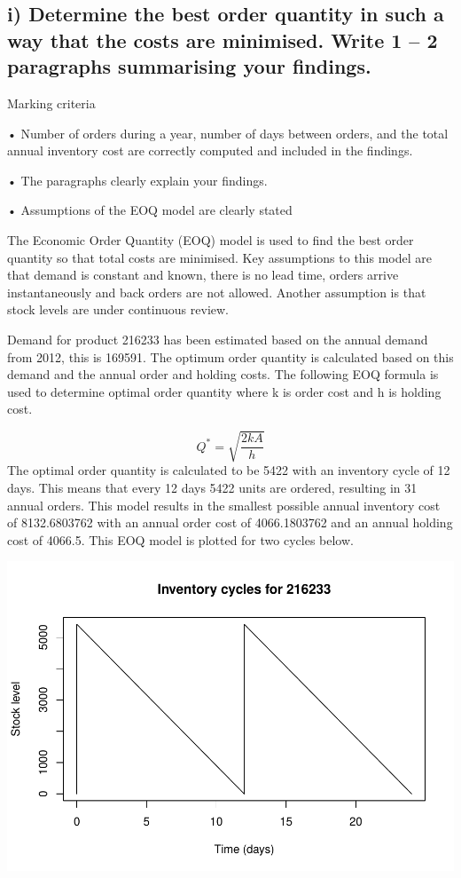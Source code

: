 \documentclass[
  11pt,
]{article}
\begin{document}
\hypertarget{i-determine-the-best-order-quantity-in-such-a-way-that-the-costs-are-minimised.-write-1-2-paragraphs-summarising-your-findings.}{%
\subsection{i) Determine the best order quantity in such a way that the
costs are minimised. Write 1 -- 2 paragraphs summarising your
findings.}\label{i-determine-the-best-order-quantity-in-such-a-way-that-the-costs-are-minimised.-write-1-2-paragraphs-summarising-your-findings.}}

Marking criteria

• Number of orders during a year, number of days between orders, and the
total annual inventory cost are correctly computed and included in the
findings.

• The paragraphs clearly explain your findings.

• Assumptions of the EOQ model are clearly stated

The Economic Order Quantity (EOQ) model is used to find the best order
quantity so that total costs are minimised. Key assumptions to this
model are that demand is constant and known, there is no lead time,
orders arrive instantaneously and back orders are not allowed. Another
assumption is that stock levels are under continuous review.

Demand for product 216233 has been estimated based on the annual demand
from 2012, this is 169591. The optimum order quantity is calculated
based on this demand and the annual order and holding costs. The
following EOQ formula is used to determine optimal order quantity where
k is order cost and h is holding cost.

\[Q^* =  \sqrt{\frac{2kA}{h}}\] The optimal order quantity is calculated
to be 5422 with an inventory cycle of 12 days. This means that every 12
days 5422 units are ordered, resulting in 31 annual orders. This model
results in the smallest possible annual inventory cost of 8132.6803762
with an annual order cost of 4066.1803762 and an annual holding cost of
4066.5. This EOQ model is plotted for two cycles below.

\includegraphics{Assignment-STAT702_files/figure-latex/2ai plot-1.pdf}
\end{document}
